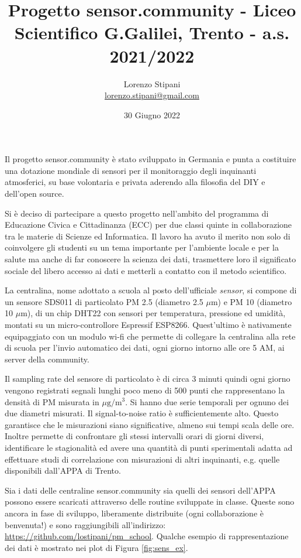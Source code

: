 \documentclass{article}
\title{Progetto sensor.community - Liceo Scientifico G.Galilei, Trento - a.s. 2021/2022}
\date{30 Giugno 2022}
\author{Lorenzo Stipani \\ \small{\url{lorenzo.stipani@gmail.com}}}
\begin{document}
\maketitle

Il progetto sensor.community è stato sviluppato in Germania e punta a costituire una dotazione mondiale di sensori per il monitoraggio degli inquinanti atmosferici, su base volontaria e privata aderendo alla filosofia del DIY e dell'open source. 

Si è deciso di partecipare a questo progetto nell'ambito del programma di Educazione Civica e Cittadinanza (ECC) per due classi quinte in collaborazione tra le materie di Scienze ed Informatica. Il lavoro ha avuto il merito non solo di coinvolgere gli studenti su un tema importante per l'ambiente locale e per la salute ma anche di far conoscere la scienza dei dati, trasmettere loro il significato sociale del libero accesso ai dati e metterli a contatto con il metodo scientifico.

La centralina, nome adottato a scuola al posto dell'ufficiale \emph{sensor}, si compone di un sensore \textsc{SDS011} di particolato PM 2.5 (diametro 2.5 $\mu$m) e PM 10 (diametro 10 $\mu$m), di un chip \textsc{DHT22} con sensori per temperatura, pressione ed umidità, montati su un micro-controllore Espressif \textsc{ESP8266}. Quest'ultimo è nativamente equipaggiato con un modulo wi-fi che permette di collegare la centralina alla rete di scuola per l'invio automatico dei dati, ogni giorno intorno alle ore 5 AM, ai server della community.

Il sampling rate del sensore di particolato è di circa 3 minuti quindi ogni giorno vengono registrati segnali lunghi poco meno di 500 punti che rappresentano la densità di PM misurata in $\mu\mathrm{g}/\mathrm{m}^3$. Si hanno due serie temporali per ognuno dei due diametri misurati. Il signal-to-noise ratio è sufficientemente alto. Questo garantisce che le misurazioni siano significative, almeno sui tempi scala delle ore. Inoltre permette di confrontare gli stessi intervalli orari di giorni diversi, identificare le stagionalità ed avere una quantità di punti sperimentali adatta ad effettuare studi di correlazione con misurazioni di altri inquinanti, e.g. quelle disponibili dall'APPA di Trento.

Sia i dati delle centraline sensor.community sia quelli dei sensori dell'APPA possono essere scaricati attraverso delle routine sviluppate in classe. Queste sono ancora in fase di sviluppo, liberamente distribuite (ogni collaborazione è benvenuta!) e sono raggiungibili all'indirizzo: \url{https://github.com/lostipani/pm_school}. Qualche esempio di rappresentazione dei dati è mostrato nei plot di Figura \ref{fig:sens_ex}.
\end{document}
